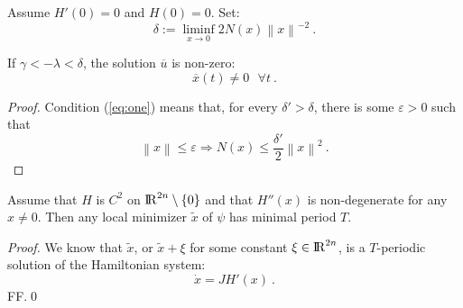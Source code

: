\documentclass{llncs}
\begin{document}
\begin{proposition}
Assume $H'(0)=0$ and $ H(0)=0$. Set:
\begin{equation}
   \delta := \liminf_{x\to 0} 2 N (x) \left\|x\right\|^{-2}\ .
   \label{eq:one}
\end{equation}

If $\gamma < - \lambda < \delta$,
the solution $\overline{u}$ is non-zero:
\begin{equation}
   \overline{x} (t) \ne 0\ \ \ \forall t\ .
\end{equation}
\end{proposition}
%
\begin{proof}
Condition (\ref{eq:one}) means that, for every $\delta ' > \delta$, there is some $\varepsilon > 0$ such that \begin{equation}
   \left\|x\right\| \le \varepsilon \Rightarrow N (x) \le
   \frac{\delta '}{2} \left\|x\right\|^{2}\ .
\end{equation}
\end{proof}

%

\begin{lemma}
Assume that $H$ is $C^{2}$ on ${\rm I\!R}^{2n} \setminus \{ 0\}$ and that $H'' (x)$ is non-de\-gen\-er\-ate for any $x\ne 0$. Then any local minimizer $\widetilde{x}$ of $\psi$ has minimal period $T$.
\end{lemma}
%
\begin{proof}
We know that $\widetilde{x}$, or
$\widetilde{x} + \xi$ for some constant $\xi \in {\rm I\!R}^{2n}$, is a $T$-periodic solution of the Hamiltonian system:
\begin{equation}
   \dot{x} = JH' (x)\ .
\end{equation}
FF.\qed \end{proof} 
\end{document}
